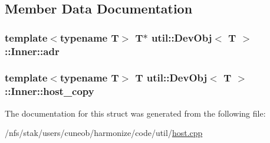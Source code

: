 \subsection{Member Data Documentation}
\hypertarget{structutil_1_1DevObj_1_1Inner_a93132ae135f7e3930cdde6b6a919dabe}{
\subsubsection[{adr}]{\setlength{\rightskip}{0pt plus 5cm}template$<$typename T$>$ T$\ast$ {\bf util\-::\-Dev\-Obj}$<$ T $>$\-::Inner\-::adr}}\label{structutil_1_1DevObj_1_1Inner_a93132ae135f7e3930cdde6b6a919dabe}
\hypertarget{structutil_1_1DevObj_1_1Inner_aff47e5591c959e53f7d38e4ff728df17}{
\subsubsection[{host\-\_\-copy}]{\setlength{\rightskip}{0pt plus 5cm}template$<$typename T$>$ T {\bf util\-::\-Dev\-Obj}$<$ T $>$\-::Inner\-::host\-\_\-copy}}\label{structutil_1_1DevObj_1_1Inner_aff47e5591c959e53f7d38e4ff728df17}


The documentation for this struct was generated from the following file\-:\begin{DoxyCompactItemize}
\item 
/nfs/stak/users/cuneob/harmonize/code/util/\hyperlink{host_8cpp}{host.\-cpp}\end{DoxyCompactItemize}
